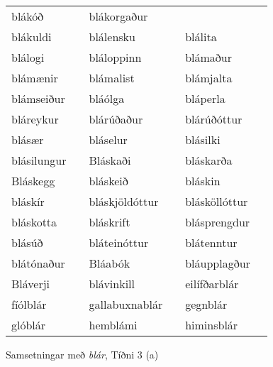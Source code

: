 \documentclass[../samsetningasafn.tex]{subfiles}
\begin{document}
\begin{wordlist}[H]
\begin{tcolorbox}
\begin{tabular}{BlBlBl}
		blákóð		&		& 		
		blákorgaður	&		\\ 	%
		blákuldi		&		& 		
		blálensku	&		& 		
		blálita		&		\\ 		%
		blálogi		&		& 		
		bláloppinn	&		& 		
		blámaður	&		\\ 		%
		blámænir	&		& 		
		blámalist	&		& 		
		blámjalta	& 		\\ 		%
		blámseiður	&		& 		
		bláólga		&		& 		
		bláperla		&		\\ 		%
		bláreykur	&		& 		
		blárúðaður	&		& 	
		blárúðóttur	&		\\ 	%
		blásær		&		& 		
		bláselur		&		& 		
		blásilki		&		\\ 		%
		blásilungur	&		& 	
		Bláskaði		&		& 		
		bláskarða	&		\\ 	%
		Bláskegg	&		& 		
		bláskeið		&		& 	
		bláskin		&		\\ 	%
		bláskír		&		& 	
		bláskjöldóttur &		& 	
		blásköllóttur	&		\\ 		%
		bláskotta	&		& 		
		bláskrift		&		& 		
		blásprengdur	&	\\ 	%
		blásúð		&		& 	
		bláteinóttur	&		& 	
		blátenntur	&		\\ 	%
		blátónaður	&		& 	
		Bláabók		&		& 		
		bláupplagður	 &		\\ 	%
		Bláverji		&		& 		
		blávinkill		&		& 		
		eilífðarblár	&		\\ 	 %
		fíólblár		&		& 		
		gallabuxnablár &		& 	
		gegnblár		&	\\ 		%
		glóblár		&		& 		
		hemblámi	&		& 	
		himinsblár	&		 	 %
	\end{tabular}

\end{tcolorbox}
	\caption{Samsetningar með \textit{blár}, Tíðni 3 (a)}
	\label{listi:blatt.3}
\end{wordlist}
\end{document}
